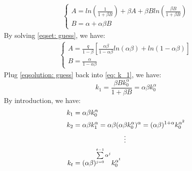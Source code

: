 \documentclass{article}
\begin{document}
\begin{align}
	\left\{
			\begin{array}{lr}
				A = ln(\frac{1}{1 + \beta B}) + \beta A + \beta B ln(\frac{\beta B}{1 + \beta B})\\
				B = \alpha + \alpha \beta B
			\end{array}
	\right.
	\label{eqset: guess}
\end{align} 
By solving \eqref{eqset: guess}, we have:
\begin{align}
	\left\{
			\begin{array}{lr}
				A = \frac{q}{1 - \beta}[\frac{\alpha \beta}{1 - \alpha \beta}ln(\alpha \beta) + ln(1 - \alpha \beta)]\\
				B = \frac{\alpha}{1 - \alpha \beta}	
			\end{array}
	\right.
	\label{eqsolution: guess}
\end{align}
Plug \eqref{eqsolution: guess} back into \eqref{eq: k_1}, we have:
\begin{equation}
	k_1 = \frac{\beta B k^\alpha_0}{1 + \beta B} = \alpha \beta k^\alpha_0
\end{equation}
By introduction, we have:
\begin{align*}
	k_1 &= \alpha \beta k^\alpha_0\\
	k_2 &= \alpha \beta k^\alpha_1 = \alpha \beta (\alpha \beta k^\alpha_0)^\alpha = (\alpha \beta)^{1+\alpha}k^{\alpha^2}_0\\
	&\indent \indent \indent \indent \indent\vdots\\
	k_t &= (\alpha \beta)^{\sum\limits^{t-1}_{j=0} \alpha^j} k^{\alpha^t}_0  
\end{align*}
\end{document}
